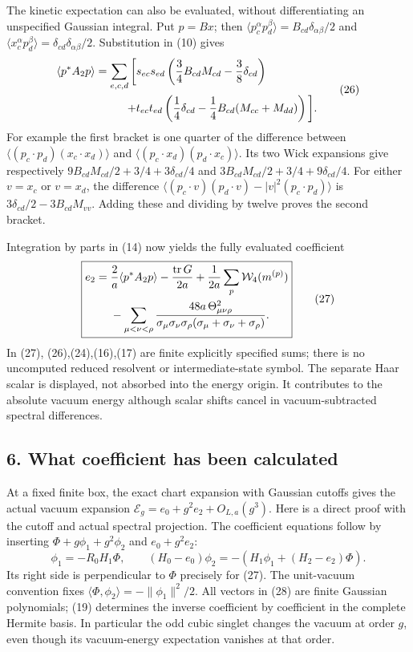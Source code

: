 \documentclass[
  11pt,
]{article}
\begin{document}
The kinetic expectation can also be evaluated, without differentiating
an unspecified Gaussian integral. Put \(p=Bx\); then
\(\langle p_c^\alpha p_d^\beta\rangle=B_{cd}\delta_{\alpha\beta}/2\) and
\(\langle x_c^\alpha p_d^\beta\rangle=
\delta_{cd}\delta_{\alpha\beta}/2\). Substitution in (10) gives \[
 \begin{split}
 \langle p^*A_2p\rangle=\sum_{e,c,d}\bigg[
 &s_{ec}s_{ed}\left({3\over4}B_{cd}M_{cd}-{3\over8}\delta_{cd}\right)\\
 +&t_{ec}t_{ed}\left({1\over4}\delta_{cd}
                       -{1\over4}B_{cd}(M_{cc}+M_{dd})\right)\bigg].
 \end{split}
 \tag{26}
\] For example the first bracket is one quarter of the difference
between \(\langle(p_c\cdot p_d)(x_c\cdot x_d)\rangle\) and
\(\langle(p_c\cdot x_d)(p_d\cdot x_c)\rangle\). Its two Wick expansions
give respectively \(9B_{cd}M_{cd}/2+3/4+3\delta_{cd}/4\) and
\(3B_{cd}M_{cd}/2+3/4+9\delta_{cd}/4\). For either \(v=x_c\) or
\(v=x_d\), the difference
\(\langle(p_c\cdot v)(p_d\cdot v)-|v|^2(p_c\cdot p_d)\rangle\) is
\(3\delta_{cd}/2-3B_{cd}M_{vv}\). Adding these and dividing by twelve
proves the second bracket.

Integration by parts in (14) now yields the fully evaluated coefficient
\[
 \boxed{\begin{split}
 e_2={}&{2\over a}\langle p^*A_2p\rangle
             -{\operatorname{tr}G\over2a}
             +{1\over2a}\sum_p\mathcal W_4(m^{(p)})\\
 &-\sum_{\mu<\nu<\rho}
 {48a\,\Theta_{\mu\nu\rho}^2\over
 \sigma_\mu\sigma_\nu\sigma_\rho(\sigma_\mu+\sigma_\nu+\sigma_\rho)} .
 \end{split}}
 \tag{27}
\] In (27), (26),(24),(16),(17) are finite explicitly specified sums;
there is no uncomputed reduced resolvent or intermediate-state symbol.
The separate Haar scalar is displayed, not absorbed into the energy
origin. It contributes to the absolute vacuum energy although scalar
shifts cancel in vacuum-subtracted spectral differences.

\subsection{6. What coefficient has been
calculated}\label{weak-coupling-part-15-what-coefficient-has-been-calculated}

At a fixed finite box, the exact chart expansion with Gaussian cutoffs
gives the actual vacuum expansion
\(\mathcal E_g=e_0+g^2e_2+O_{L,a}(g^3)\). Here is a direct proof with
the cutoff and actual spectral projection. The coefficient equations
follow by inserting \(\Phi+g\phi_1+g^2\phi_2\) and \(e_0+g^2e_2\): \[
 \phi_1=-R_0H_1\Phi,\qquad
 (H_0-e_0)\phi_2=-(H_1\phi_1+(H_2-e_2)\Phi).
 \tag{28}
\] Its right side is perpendicular to \(\Phi\) precisely for (27). The
unit-vacuum convention fixes
\(\langle\Phi,\phi_2\rangle=-\|\phi_1\|^2/2\). All vectors in (28) are
finite Gaussian polynomials; (19) determines the inverse coefficient by
coefficient in the complete Hermite basis. In particular the odd cubic
singlet changes the vacuum at order \(g\), even though its vacuum-energy
expectation vanishes at that order.
\end{document}
